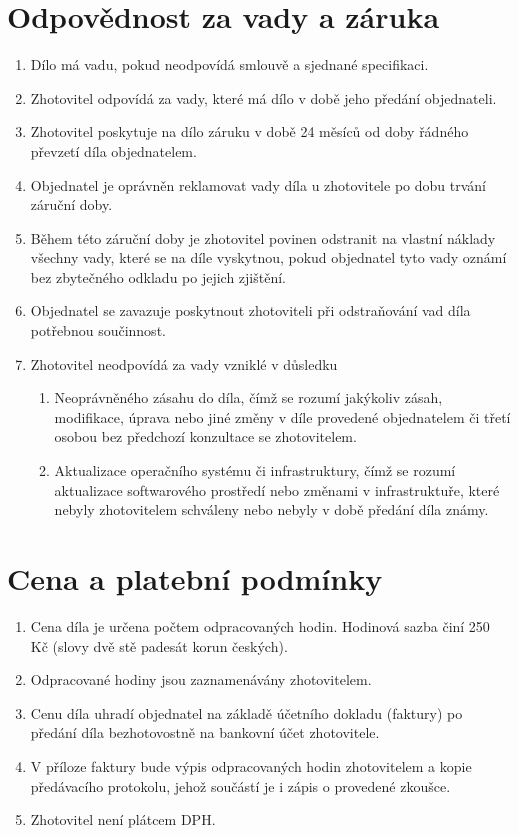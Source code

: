 \documentclass[]{article}
\begin{document}
\section{Odpovědnost za vady a záruka}
\begin{enumerate}
	\item Dílo má vadu, pokud neodpovídá smlouvě a sjednané specifikaci.
	\item Zhotovitel odpovídá za vady, které má dílo v době jeho předání objednateli.
	\item Zhotovitel poskytuje na dílo záruku v době 24 měsíců od doby řádného převzetí díla objednatelem. 
	\item Objednatel je oprávněn reklamovat vady díla u zhotovitele po dobu trvání
	záruční doby.
	\item Během této záruční doby je zhotovitel povinen odstranit na vlastní náklady všechny vady, které se na díle vyskytnou, pokud objednatel tyto vady oznámí bez zbytečného odkladu po jejich zjištění.
	\item Objednatel se zavazuje poskytnout zhotoviteli při odstraňování vad díla potřebnou součinnost.
	\item Zhotovitel neodpovídá za vady vzniklé v důsledku
		\begin{enumerate}
			\item Neoprávněného zásahu do díla, čímž se rozumí jakýkoliv zásah, modifikace, úprava nebo jiné změny v díle provedené objednatelem či třetí osobou bez předchozí konzultace se zhotovitelem.
			\item Aktualizace operačního systému či infrastruktury, čímž se rozumí aktualizace softwarového prostředí nebo změnami v infrastruktuře, které nebyly zhotovitelem schváleny nebo nebyly v době předání díla známy.
		\end{enumerate}
\end{enumerate}


\section{Cena a platební podmínky}
\begin{enumerate}
	\item Cena díla je určena počtem odpracovaných hodin. Hodinová sazba činí 250 Kč (slovy dvě stě padesát korun českých).
	\item Odpracované hodiny jsou zaznamenávány zhotovitelem.
	\item Cenu díla uhradí objednatel na základě účetního dokladu (faktury) po předání díla bezhotovostně na bankovní účet zhotovitele.
	\item V příloze faktury bude výpis odpracovaných hodin zhotovitelem a kopie předávacího protokolu, jehož součástí je i zápis o provedené zkoušce.
	\item Zhotovitel není plátcem DPH.
\end{enumerate}
\end{document}
